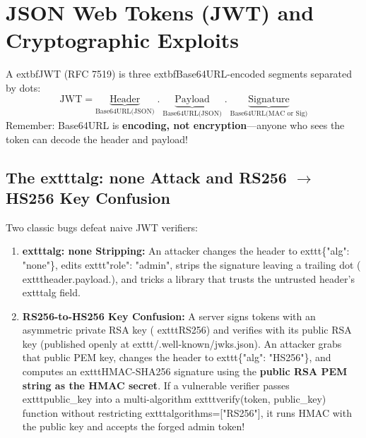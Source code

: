 \section{JSON Web Tokens (JWT) and Cryptographic Exploits}

A 	extbf{JWT (RFC 7519)} \cite{rfc7519} is three 	extbf{Base64URL-encoded} segments separated by dots:
$$\text{JWT} = \underbrace{\text{Header}}_{\text{Base64URL(JSON)}} \;.\; \underbrace{\text{Payload}}_{\text{Base64URL(JSON)}} \;.\; \underbrace{\text{Signature}}_{\text{Base64URL(MAC or Sig)}}$$
Remember: Base64URL is \textbf{encoding, not encryption}---anyone who sees the token can decode the header and payload!

\subsection{The 	exttt{alg: none} Attack and RS256 $\to$ HS256 Key Confusion}

Two classic bugs defeat naive JWT verifiers:
\begin{enumerate}[leftmargin=15pt]
  \item \textbf{	exttt{alg: none} Stripping:} An attacker changes the header to 	exttt{\{"alg": "none"\}}, edits 	exttt{"role": "admin"}, strips the signature leaving a trailing dot (	exttt{header.payload.}), and tricks a library that trusts the untrusted header's 	exttt{alg} field.
  \item \textbf{RS256-to-HS256 Key Confusion:} A server signs tokens with an asymmetric private RSA key (	exttt{RS256}) and verifies with its public RSA key (published openly at 	exttt{/.well-known/jwks.json}). An attacker grabs that public PEM key, changes the header to 	exttt{\{"alg": "HS256"\}}, and computes an 	exttt{HMAC-SHA256} signature using the \textbf{public RSA PEM string as the HMAC secret}. If a vulnerable verifier passes 	exttt{public\_key} into a multi-algorithm 	exttt{verify(token, public\_key)} function without restricting 	exttt{algorithms=["RS256"]}, it runs HMAC with the public key and accepts the forged admin token!
\end{enumerate}

